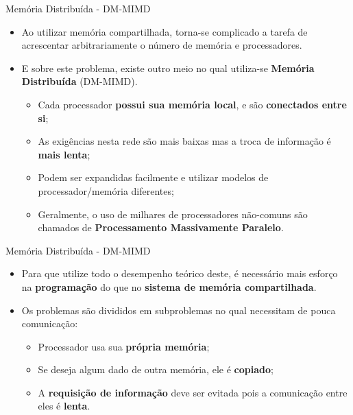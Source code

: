\begin{frame}{Memória Distribuída - DM-MIMD}
	\begin{itemize}
		\item Ao utilizar memória compartilhada, torna-se complicado a tarefa de acrescentar arbitrariamente o número de memória e processadores.
		\item E sobre este problema, existe outro meio no qual utiliza-se \textbf{Memória Distribuída} (DM-MIMD).
		\begin{itemize}
			\item Cada processador \textbf{possui sua memória local}, e são \textbf{conectados entre si};
			\item As exigências nesta rede são mais baixas mas a troca de informação é \textbf{mais lenta};
			\item Podem ser expandidas facilmente e utilizar modelos de processador/memória diferentes;
			\item Geralmente, o uso de milhares de processadores não-comuns são chamados de \textbf{Processamento Massivamente Paralelo}.
		\end{itemize}

	\end{itemize}

\end{frame}


\begin{frame}{Memória Distribuída - DM-MIMD}
	\begin{itemize}
		\item Para que utilize todo o desempenho teórico deste, é necessário mais esforço na \textbf{programação} do que no \textbf{sistema de memória compartilhada}.
		\item Os problemas são divididos em subproblemas no qual necessitam de pouca comunicação:
		\begin{itemize}
			\item Processador usa sua \textbf{própria memória};
			\item Se deseja algum dado de outra memória, ele é \textbf{copiado};
			\item A \textbf{requisição de informação} deve ser evitada pois a comunicação entre eles é \textbf{lenta}.
		\end{itemize}

	\end{itemize}

\end{frame}








